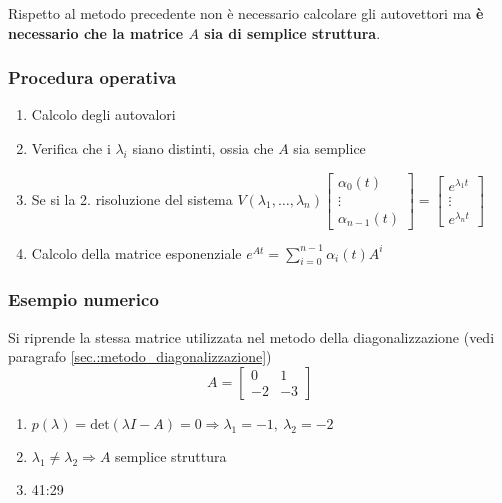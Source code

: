 Rispetto al metodo precedente non è necessario calcolare gli autovettori ma
\textbf{è necessario che la matrice $A$ sia di semplice struttura}.

\subsubsection{Procedura operativa}
\begin{enumerate}
 \item Calcolo degli autovalori
 \item Verifica che i $\lambda_i$ siano distinti, ossia che $A$ sia semplice
 \item Se si la 2. risoluzione del sistema
$V(\lambda_1,\ldots,\lambda_n)\begin{bmatrix}
\alpha_0(t) \\ \vdots \\ \alpha_{n-1}(t) \end{bmatrix}= \begin{bmatrix}
e^{\lambda_1 t } \\ \vdots \\ e^{\lambda_n t}
\end{bmatrix}$
\item Calcolo della matrice esponenziale $e^{At} = \sum_{i=0}^{n-1}
\alpha_i(t)A^i$
\end{enumerate}

\subsubsection{Esempio numerico}
Si riprende la stessa matrice utilizzata nel metodo della diagonalizzazione
(vedi paragrafo \ref{sec.:metodo_diagonalizzazione})
$$
A = \begin{bmatrix}
0 & 1\\
-2 & -3
\end{bmatrix}
$$
\begin{enumerate}
\item $p(\lambda) = \text{det} (\lambda I -A) = 0\Rightarrow \lambda_1 = -1,\
\lambda_2 = -2$
\item $\lambda_1\neq \lambda_2 \Rightarrow A $ semplice struttura
\item 41:29
\end{enumerate}
